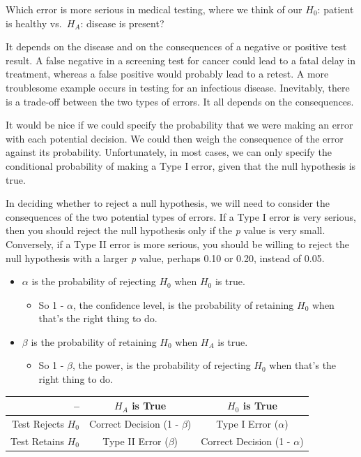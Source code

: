 \documentclass[
]{book}
\providecommand{\tightlist}{%
  \setlength{\itemsep}{0pt}\setlength{\parskip}{0pt}}
\begin{document}
Which error is more serious in medical testing, where we think of our \(H_0\): patient is healthy vs.~\(H_A\): disease is present?

It depends on the disease and on the consequences of a negative or positive test result. A false negative in a screening test for cancer could lead to a fatal delay in treatment, whereas a false positive would probably lead to a retest. A more troublesome example occurs in testing for an infectious disease. Inevitably, there is a trade-off between the two types of errors. It all depends on the consequences.

It would be nice if we could specify the probability that we were making an error with each potential decision. We could then weigh the consequence of the error against its probability. Unfortunately, in most cases, we can only specify the conditional probability of making a Type I error, given that the null hypothesis is true.

In deciding whether to reject a null hypothesis, we will need to consider the consequences of the two potential types of errors. If a Type I error is very serious, then you should reject the null hypothesis only if the \emph{p} value is very small. Conversely, if a Type II error is more serious, you should be willing to reject the null hypothesis with a larger \emph{p} value, perhaps 0.10 or 0.20, instead of 0.05.

\begin{itemize}
\tightlist
\item
  \(\alpha\) is the probability of rejecting \(H_0\) when \(H_0\) is true.

  \begin{itemize}
  \tightlist
  \item
    So 1 - \(\alpha\), the confidence level, is the probability of retaining \(H_0\) when that's the right thing to do.
  \end{itemize}
\item
  \(\beta\) is the probability of retaining \(H_0\) when \(H_A\) is true.

  \begin{itemize}
  \tightlist
  \item
    So 1 - \(\beta\), the power, is the probability of rejecting \(H_0\) when that's the right thing to do.
  \end{itemize}
\end{itemize}

\begin{longtable}[]{@{}rcc@{}}
\toprule
-- & \(H_A\) is True & \(H_0\) is True\tabularnewline
\midrule
\endhead
Test Rejects \(H_0\) & Correct Decision (1 - \(\beta\)) & Type I Error (\(\alpha\))\tabularnewline
Test Retains \(H_0\) & Type II Error (\(\beta\)) & Correct Decision (1 - \(\alpha\))\tabularnewline
\bottomrule
\end{longtable}
\end{document}
